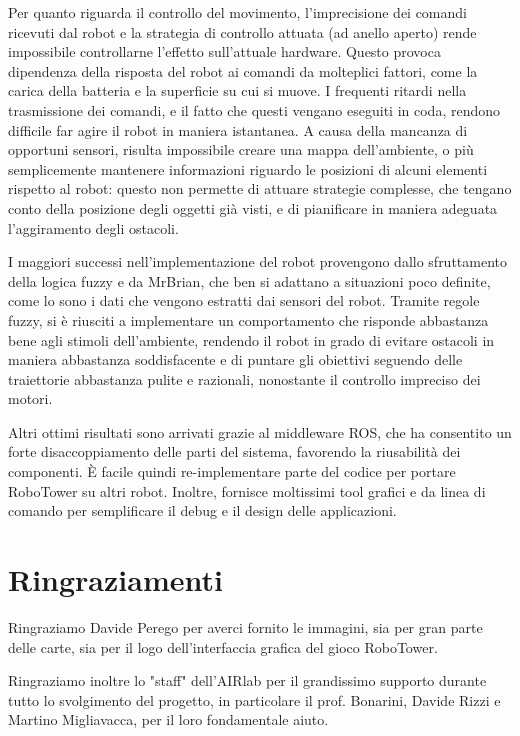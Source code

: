 Per quanto riguarda il controllo del movimento, l'imprecisione dei comandi ricevuti dal robot e la strategia di controllo attuata (ad anello aperto) rende impossibile controllarne l'effetto sull'attuale hardware. Questo provoca dipendenza della risposta del robot ai comandi da molteplici fattori, come la carica della batteria e la superficie su cui si muove. I frequenti ritardi nella trasmissione dei comandi, e il fatto che questi vengano eseguiti in coda, rendono difficile far agire il robot in maniera istantanea. A causa della mancanza di opportuni sensori, risulta impossibile creare una mappa dell'ambiente, o più semplicemente mantenere informazioni riguardo le posizioni di alcuni elementi rispetto al robot: questo non permette di attuare strategie complesse, che tengano conto della posizione degli oggetti già visti, e di pianificare in maniera adeguata l'aggiramento degli ostacoli.

I maggiori successi nell'implementazione del robot provengono dallo sfruttamento della logica fuzzy e da MrBrian, che ben si adattano a situazioni poco definite, come lo sono i dati che vengono estratti dai sensori del robot. Tramite regole fuzzy, si è riusciti a implementare un comportamento che risponde abbastanza bene agli stimoli dell'ambiente, rendendo il robot in grado di evitare ostacoli in maniera abbastanza soddisfacente e di puntare gli obiettivi seguendo delle traiettorie abbastanza pulite e razionali, nonostante il controllo impreciso dei motori.

Altri ottimi risultati sono arrivati grazie al middleware ROS, che ha consentito un forte disaccoppiamento delle parti del sistema, favorendo la riusabilità dei componenti. È facile quindi re-implementare parte del codice per portare RoboTower su altri robot. Inoltre, fornisce  moltissimi tool grafici e da linea di comando per semplificare il debug e il design delle applicazioni. 


\section{Ringraziamenti}

Ringraziamo Davide Perego per averci fornito le immagini, sia per gran parte delle carte, sia per il logo dell'interfaccia grafica del gioco RoboTower.

Ringraziamo inoltre lo "staff" dell'AIRlab per il grandissimo supporto durante tutto lo svolgimento del progetto, in particolare il prof. Bonarini, Davide Rizzi e Martino Migliavacca, per il loro fondamentale aiuto.